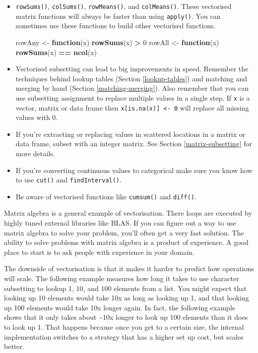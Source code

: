 \documentclass[]{book}
\newenvironment{Shaded}{\begin{snugshade}}{\end{snugshade}}
\newcommand{\ControlFlowTok}[1]{\textcolor[rgb]{0.27,0.27,0.27}{\textbf{#1}}}
\newcommand{\DecValTok}[1]{\textcolor[rgb]{0.06,0.06,0.06}{#1}}
\newcommand{\KeywordTok}[1]{\textcolor[rgb]{0.27,0.27,0.27}{\textbf{#1}}}
\newcommand{\NormalTok}[1]{#1}
\newcommand{\OperatorTok}[1]{\textcolor[rgb]{0.43,0.43,0.43}{\textbf{#1}}}
\newcommand{\StringTok}[1]{\textcolor[rgb]{0.5,0.5,0.5}{#1}}
\begin{document}
\begin{itemize}
\item
  \texttt{rowSums()}, \texttt{colSums()}, \texttt{rowMeans()}, and \texttt{colMeans()}. These vectorised
  matrix functions will always be faster than using \texttt{apply()}. You can
  sometimes use these functions to build other vectorised functions.

\begin{Shaded}
\begin{Highlighting}[]
\NormalTok{rowAny <-}\StringTok{ }\ControlFlowTok{function}\NormalTok{(x) }\KeywordTok{rowSums}\NormalTok{(x) }\OperatorTok{>}\StringTok{ }\DecValTok{0}
\NormalTok{rowAll <-}\StringTok{ }\ControlFlowTok{function}\NormalTok{(x) }\KeywordTok{rowSums}\NormalTok{(x) }\OperatorTok{==}\StringTok{ }\KeywordTok{ncol}\NormalTok{(x)}
\end{Highlighting}
\end{Shaded}
\item
  Vectorised subsetting can lead to big improvements in speed. Remember the
  techniques behind lookup tables (Section \ref{lookup-tables}) and matching
  and merging by hand (Section \ref{matching-merging}). Also
  remember that you can use subsetting assignment to replace multiple values in
  a single step. If \texttt{x} is a vector, matrix or data frame then
  \texttt{x{[}is.na(x){]}\ \textless{}-\ 0} will replace all missing values with 0.
\item
  If you're extracting or replacing values in scattered locations in a matrix
  or data frame, subset with an integer matrix.
  See Section \ref{matrix-subsetting} for more details.
\item
  If you're converting continuous values to categorical make sure you know
  how to use \texttt{cut()} and \texttt{findInterval()}.
\item
  Be aware of vectorised functions like \texttt{cumsum()} and \texttt{diff()}.
\end{itemize}

Matrix algebra is a general example of vectorisation. There loops are executed by highly tuned external libraries like BLAS. If you can figure out a way to use matrix algebra to solve your problem, you'll often get a very fast solution. The ability to solve problems with matrix algebra is a product of experience. A good place to start is to ask people with experience in your domain.

The downside of vectorisation is that it makes it harder to predict how operations will scale. The following example measures how long it takes to use character subsetting to lookup 1, 10, and 100 elements from a list. You might expect that looking up 10 elements would take 10x as long as looking up 1, and that looking up 100 elements would take 10x longer again. In fact, the following example shows that it only takes about \textasciitilde{}10x longer to look up 100 elements than it does to look up 1. That happens because once you get to a certain size, the internal implementation switches to a strategy that has a higher set up cost, but scales better.
\end{document}
